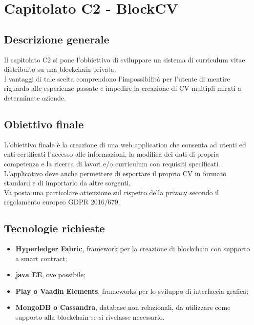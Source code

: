 \documentclass[StudioDiFattibilità.tex]{subfiles}
\begin{document}
\chapter{Capitolato C2 - BlockCV}
\section{Descrizione generale}
Il capitolato C2 si pone l'obbiettivo di sviluppare un sistema di curriculum vitae distribuito su una blockchain privata.\\
I vantaggi di tale scelta comprendono l'impossibilità per l'utente di mentire riguardo alle esperienze passate e impedire la creazione di CV multipli mirati a determinate aziende.
\section{Obiettivo finale}
L'obiettivo finale è la creazione di una web application che consenta ad utenti ed enti certificati l'accesso alle informazioni, la modifica dei dati di propria competenza e la ricerca di lavori e/o curriculum con requisiti specificati.\\
L'applicativo deve anche permettere di esportare il proprio CV in formato standard e di importarlo da altre sorgenti.\\
Va posta una particolare attenzione sul rispetto della privacy secondo il regolamento europeo GDPR 2016/679.
\section{Tecnologie richieste}
\begin{itemize}
	\item \textbf{Hyperledger Fabric}, framework per la creazione di blockchain con supporto a smart contract;
	\item \textbf{java EE}, ove possibile;
	\item \textbf{Play o Vaadin Elements}, frameworks per lo sviluppo di interfaccia grafica;
	\item \textbf{MongoDB o Cassandra}, database non relazionali, da utilizzare come supporto alla blockchain se si rivelasse necessario.
\end{itemize}
\end{document}
